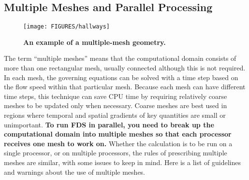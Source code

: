 \documentclass[11pt]{book}
\begin{document}
\subsection{Multiple Meshes and Parallel Processing}
\label{info:multimesh}

\begin{figure}[ht!]
\texttt{[image: FIGURES/hallways]}
\caption{\bf An example of a multiple-mesh geometry.}
\label{fig:domain}
\end{figure}

The term ``multiple meshes'' means that the computational domain consists of
more than one rectangular mesh, usually connected although this is not
required. In each mesh, the governing equations can be solved with a time
step based on the flow speed within that particular mesh. Because each
mesh can have different time steps, this technique can save CPU time by
requiring relatively coarse meshes to be updated only when necessary.
Coarse meshes are best used in regions where temporal and spatial gradients of key
quantities are small or unimportant.
{\bf To run FDS in parallel, you need to break up the computational domain into
multiple meshes so that each processor receives one mesh to work on.} Whether
the calculation is to be run on a single processor, or on multiple processors,
the rules of prescribing multiple meshes are similar, with some issues to keep in mind.
Here is a list of guidelines and warnings about the use of multiple meshes.
\end{document}
